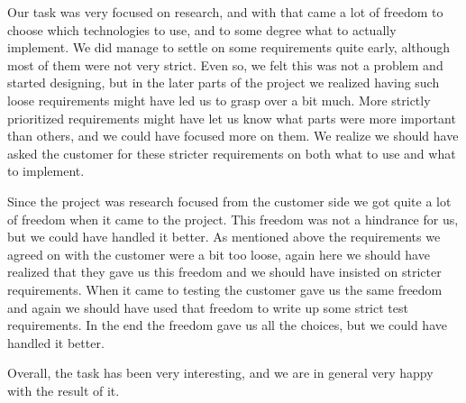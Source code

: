 Our task was very focused on research, and with that came a lot of freedom to choose which technologies to use, and to some degree what to actually implement. We did manage to settle on some requirements quite early, although most of them were not very strict. Even so, we felt this was not a problem and started designing, but in the later parts of the project we realized having such loose requirements might have led us to grasp over a bit much. More strictly prioritized requirements might have let us know what parts were more important than others, and we could have focused more on them. We realize we should have asked the customer for these stricter requirements on both what to use and what to implement.

Since the project was research focused from the customer side we got quite a lot of freedom when it came to the project. This freedom was not a hindrance for us, but we could have handled it better. As mentioned above the requirements we agreed on with the customer were a bit too loose, again here we should have realized that they gave us this freedom and we should have insisted on stricter requirements. When it came to testing the customer gave us the same freedom and again we should have used that freedom to write up some strict test requirements. In the end the freedom gave us all the choices, but we could have handled it better.

Overall, the task has been very interesting, and we are in general very happy with the result of it.

